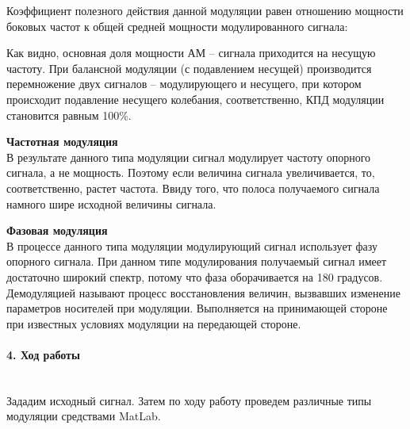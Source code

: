 \documentclass[12pt,a4paper]{report}
\begin{document}
Коэффициент полезного действия данной модуляции равен отношению мощности боковых частот к общей средней мощности модулированного сигнала:

\begin{figure}[h!]
\end{figure}

Как видно, основная доля мощности АМ – сигнала приходится на несущую частоту. При балансной модуляции (с подавлением несущей) производится перемножение двух сигналов – модулирующего и несущего, при котором происходит подавление несущего колебания, соответственно, КПД модуляции становится равным 100\%.

\textbf{Частотная модуляция\\}
В результате данного типа модуляции сигнал модулирует частоту опорного сигнала, а не мощность. Поэтому если величина сигнала увеличивается, то, соответственно, растет частота. Ввиду того, что полоса получаемого сигнала намного шире исходной величины сигнала.

\textbf{Фазовая модуляция\\}
В процессе данного типа модуляции модулирующий сигнал использует фазу опорного сигнала. При данном типе модулирования получаемый сигнал имеет достаточно широкий спектр, потому что фаза оборачивается на 180 градусов.\\

Демодуляцией называют процесс восстановления величин, вызвавших изменение параметров носителей при модуляции. Выполняется на принимающей стороне при известных условиях модуляции на передающей стороне.

\paragraph{4. Ход работы \\\\}
Зададим исходный сигнал. Затем по ходу работу проведем различные типы модуляции средствами MatLab.
\end{document}
